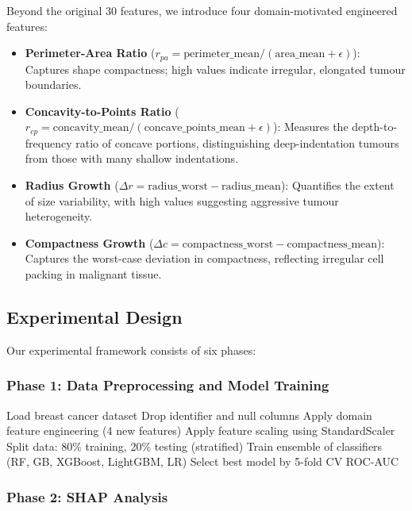 \documentclass[journal]{IEEEtran}
\begin{document}
Beyond the original 30 features, we introduce four domain-motivated engineered features:

\begin{itemize}
\item \textbf{Perimeter-Area Ratio} ($r_{pa} = \text{perimeter\_mean} / (\text{area\_mean} + \epsilon)$): Captures shape compactness; high values indicate irregular, elongated tumour boundaries.
\item \textbf{Concavity-to-Points Ratio} ($r_{cp} = \text{concavity\_mean} / (\text{concave\_points\_mean} + \epsilon)$): Measures the depth-to-frequency ratio of concave portions, distinguishing deep-indentation tumours from those with many shallow indentations.
\item \textbf{Radius Growth} ($\Delta r = \text{radius\_worst} - \text{radius\_mean}$): Quantifies the extent of size variability, with high values suggesting aggressive tumour heterogeneity.
\item \textbf{Compactness Growth} ($\Delta c = \text{compactness\_worst} - \text{compactness\_mean}$): Captures the worst-case deviation in compactness, reflecting irregular cell packing in malignant tissue.
\end{itemize}

\subsection{Experimental Design}

Our experimental framework consists of six phases:

\subsubsection{Phase 1: Data Preprocessing and Model Training}
\begin{algorithm}
\caption{Data Preprocessing Pipeline}
\begin{algorithmic}[1]
\STATE Load breast cancer dataset
\STATE Drop identifier and null columns
\STATE Apply domain feature engineering (4 new features)
\STATE Apply feature scaling using StandardScaler
\STATE Split data: 80\% training, 20\% testing (stratified)
\STATE Train ensemble of classifiers (RF, GB, XGBoost, LightGBM, LR)
\STATE Select best model by 5-fold CV ROC-AUC
\end{algorithmic}
\end{algorithm}

\subsubsection{Phase 2: SHAP Analysis}
\end{document}
